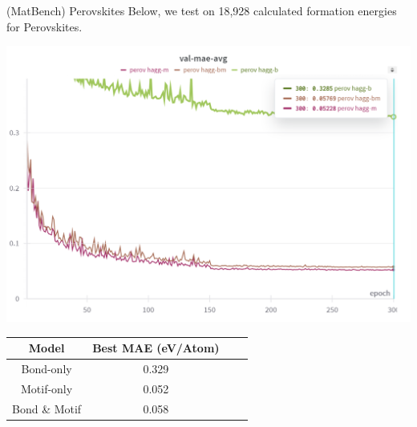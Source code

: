 \documentclass[11pt]{beamer}
\begin{document}
\begin{frame}{(MatBench) Perovskites}\small
Below, we test on 18,928 calculated formation energies for Perovskites.
\begin{center}
\includegraphics[scale=0.4]{perovskites.png}

\medskip


\begin{tabular}{c|ccc}
Model & Best MAE (eV/Atom) \\
\hline
Bond-only & 0.329\\
Motif-only & 0.052\\
Bond \& Motif & 0.058\\
\end{tabular}
\end{center}
\end{frame}
\end{document}
